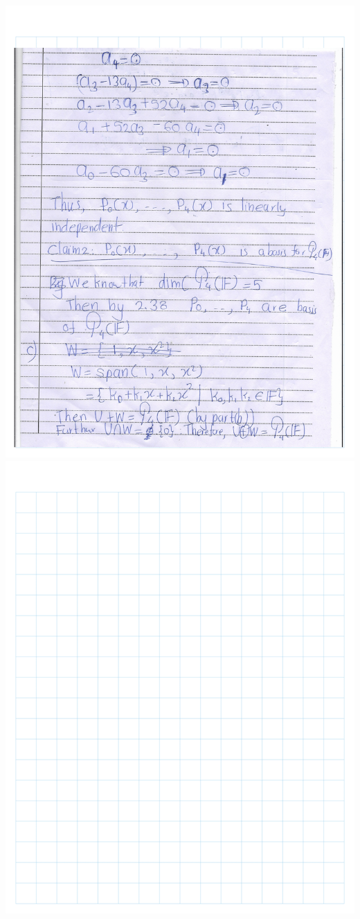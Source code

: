 \documentclass[
]{book}
\theoremstyle{definition}
\theoremstyle{definition}
\theoremstyle{definition}
\theoremstyle{definition}
\theoremstyle{remark}
\begin{document}
\includegraphics{fig/Ex 2B and 2C/Ex 2c (28).png}
\includegraphics{fig/Ex 2B and 2C/Ex 2c (29).png}
\end{document}
